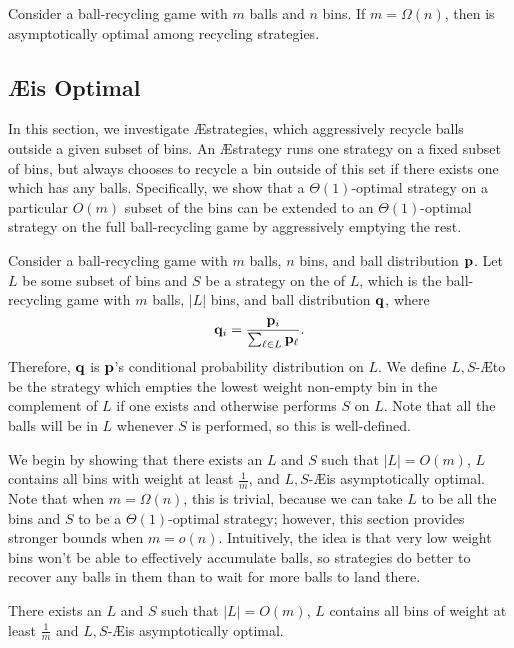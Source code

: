 \begin{corollary}\label{cor:rboptmanyballs}
	Consider a ball-recycling game with $m$ balls and $n$ bins.  If $m =
	\Omega(n)$, then \RB is asymptotically optimal among recycling strategies. 
\end{corollary}

\subsection{\AE is Optimal}\label{sec:br-randomballaggroempty}

In this section, we investigate \AE strategies, which aggressively recycle
balls outside a given subset of bins.  An \AE strategy runs one strategy on a
fixed subset of bins, but always chooses to recycle a bin outside of this set
if there exists one which has any balls.  Specifically, we show that a
$\Theta(1)$-optimal strategy on a particular $O(m)$ subset of the bins can be
extended to an $\Theta(1)$-optimal strategy on the full ball-recycling game by
aggressively emptying the
rest.

Consider a ball-recycling game with $m$ balls, $n$ bins, and ball distribution
$\mathbf{p}$. Let $L$ be some subset of bins and $S$ be a strategy on the  of $L$, which is the ball-recycling game with $m$ balls,
$|L|$ bins, and ball distribution $\mathbf{q}$, where 
\begin{equation*}
	\mathbf{q}_i = \frac{\mathbf{p}_i}{\sum_{\ell \in L} \mathbf{p}_\ell}.
\end{equation*}
Therefore, $\mathbf{q}$ is $\mathbf{p}$'s conditional probability distribution on $L$. We
define $L,S$-\AE to be the strategy which empties the lowest weight non-empty
bin in the complement of $L$ if one exists and otherwise performs $S$ on $L$.
Note that all the balls will be in $L$ whenever $S$ is performed, so this is
well-defined.

We begin by showing that there exists an $L$ and $S$ such that $|L|=O(m)$, $L$
contains all bins with weight at least $\frac{1}{m}$, and $L,S$-\AE is
asymptotically optimal. Note that when $m = \Omega(n)$, this is trivial,
because we can take $L$ to be all the bins and $S$ to be a $\Theta(1)$-optimal
strategy; however, this section provides stronger bounds when $m = o(n)$.
Intuitively, the idea is that very low weight bins won't be able to effectively
accumulate balls, so strategies do better to recover any balls in them than to
wait for more balls to land there.

\begin{lemma}\label{lem:aggroopt}
	There exists an $L$ and $S$ such that $|L|=O(m)$, $L$ contains all bins of
	weight at least $\frac{1}{m}$ and $L,S$-\AE is asymptotically optimal.
\end{lemma}

